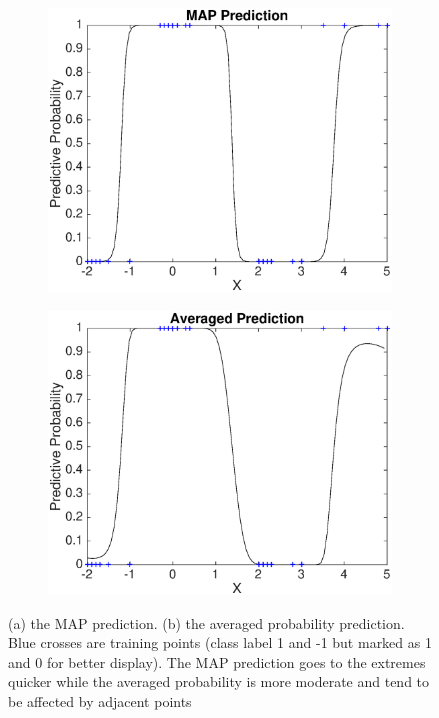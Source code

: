 \documentclass[11pt]{report}
\numberwithin{equation}{chapter}
\begin{document}
\begin{spacing}{2}
\begin{figure}[!htb]
\begin{subfigure}{0.48\textwidth}
\centering
	\includegraphics[scale = 0.42]{classification_MAP.eps}
	\caption{}
\end{subfigure}%
\hspace*{0.03\textwidth}
\begin{subfigure}{0.48\textwidth}
\centering
	\includegraphics[scale = 0.42]{classification_ave.eps}
	\caption{}
\end{subfigure}

\caption{(a) the MAP prediction. (b) the averaged probability prediction. Blue crosses are training points (class label 1 and -1 but marked as 1 and 0 for better display). The MAP prediction goes to the extremes quicker while the averaged probability is more moderate and tend to be affected by adjacent points}


\end{figure}
\end{spacing}
\end{document}
